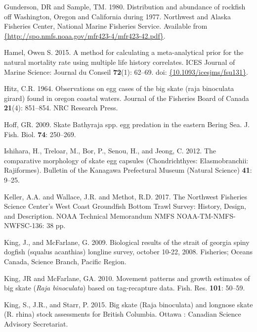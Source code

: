 \documentclass[12pt,]{article}
\begin{document}
\leavevmode\hypertarget{ref-Gunderson1980}{}%
Gunderson, DR and Sample, TM. 1980. Distribution and abundance of
rockfish off Washington, Oregon and California during 1977. Northwest
and Alaska Fisheries Center, National Marine Fisheries Service.
Available from
\href{\%7Bhttp://spo.nmfs.noaa.gov/mfr423-4/mfr423-42.pdf\%7D}{\{http://spo.nmfs.noaa.gov/mfr423-4/mfr423-42.pdf\}}.

\leavevmode\hypertarget{ref-Hamel2015}{}%
Hamel, Owen S. 2015. A method for calculating a meta-analytical prior
for the natural mortality rate using multiple life history correlates.
ICES Journal of Marine Science: Journal du Conseil \textbf{72}(1):
62--69. doi:
\href{https://doi.org/\%7B10.1093/icesjms/fsu131\%7D}{\{10.1093/icesjms/fsu131\}}.

\leavevmode\hypertarget{ref-Hitz1964}{}%
Hitz, C.R. 1964. Observations on egg cases of the big skate (raja
binoculata girard) found in oregon coastal waters. Journal of the
Fisheries Board of Canada \textbf{21}(4): 851--854. NRC Research Press.

\leavevmode\hypertarget{ref-Hoff2009}{}%
Hoff, GR. 2009. Skate Bathyraja spp. egg predation in the eastern Bering
Sea. J. Fish. Biol. \textbf{74}: 250--269.

\leavevmode\hypertarget{ref-Ishihara2012}{}%
Ishihara, H., Treloar, M., Bor, P., Senou, H., and Jeong, C. 2012. The
comparative morphology of skate egg capsules (Chondrichthyes:
Elasmobranchii: Rajiformes). Bulletin of the Kanagawa Prefectural Museum
(Natural Science) \textbf{41}: 9--25.

\leavevmode\hypertarget{ref-Keller2017}{}%
Keller, A.A. and Wallace, J.R. and Methot, R.D. 2017. The Northwest
Fisheries Science Center's West Coast Groundfish Bottom Trawl Survey:
History, Design, and Description. NOAA Technical Memorandum NMFS
NOAA-TM-NMFS-NWFSC-136: 38 pp.

\leavevmode\hypertarget{ref-KingandMcF2009}{}%
King, J., and McFarlane, G. 2009. Biological results of the strait of
georgia spiny dogfish (squalus acanthias) longline survey, october
10-22, 2008. Fisheries; Oceans Canada, Science Branch, Pacific Region.

\leavevmode\hypertarget{ref-KingandMcF2010}{}%
King, JR and McFarlane, GA. 2010. Movement patterns and growth estimates
of big skate (\emph{Raja binoculata}) based on tag-recapture data. Fish.
Res. \textbf{101}: 50--59.

\leavevmode\hypertarget{ref-King2015}{}%
King, S., J.R., and Starr, P. 2015. Big skate (Raja binoculata) and
longnose skate (R. rhina) stock assessments for British Columbia. Ottawa
: Canadian Science Advisory Secretariat.
\end{document}
